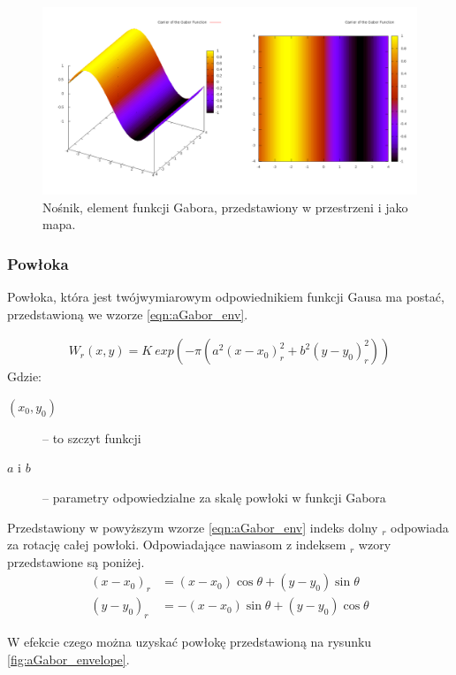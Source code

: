 \begin{figure}[ht]
	\centering
	\includegraphics[width=1\textwidth]{images/carrier.png}
	\caption{Nośnik, element funkcji Gabora, przedstawiony w przestrzeni i jako mapa.}
	\label{fig:aGabor_carrier}
\end{figure}

\subsubsection{Powłoka}
\label{aGabor_envelope}

Powłoka, która jest twójwymiarowym odpowiednikiem funkcji Gausa ma postać, przedstawioną we wzorze \ref{eqn:aGabor_env}.

\begin{align}\label{eqn:aGabor_env}
W_r(x, y) = K \ exp(-\pi (a^2(x-x_0)^2_r + b^2(y-y_0)^2_r))
\end{align}
Gdzie: 
\begin{description}
\item [$(x_0, y_0)$] -- to szczyt funkcji
\item [$a$ i $b$] -- parametry odpowiedzialne za skalę powłoki w funkcji Gabora
\end{description}
Przedstawiony w powyższym wzorze \ref{eqn:aGabor_env} indeks dolny $_r$ odpowiada za rotację całej powłoki. Odpowiadające nawiasom z indeksem $_r$ wzory przedstawione są poniżej.
\begin{align}\label{eqn:aGabor_env__r}
(x-x_0)_r &= (x-x_0)\cos \theta + (y-y_0)\sin \theta\\
(y-y_0)_r &= -(x-x_0)\sin \theta + (y-y_0)\cos \theta
\end{align}

W efekcie czego można uzyskać powłokę przedstawioną na rysunku \ref{fig:aGabor_envelope}.

